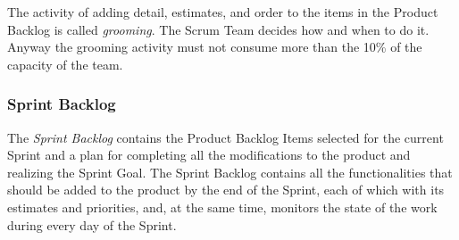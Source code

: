 			The activity of adding detail, estimates, and order to the items in the Product Backlog is called \emph{grooming}. The Scrum Team decides how and when to do it. Anyway the grooming activity must not consume more than the 10\% of the capacity of the team. 
		

			\subsubsection{Sprint Backlog}\label{ref_scrum_sprint_backlog}
			The \emph{Sprint Backlog} contains the Product Backlog Items selected for the current Sprint and a plan for completing all the modifications to the product and realizing the Sprint Goal. 
			The Sprint Backlog contains all the functionalities that should be added to the product by the end of the Sprint, each of which with its estimates and priorities, and, at the same time, monitors the state of the work during every day of the Sprint.
			
